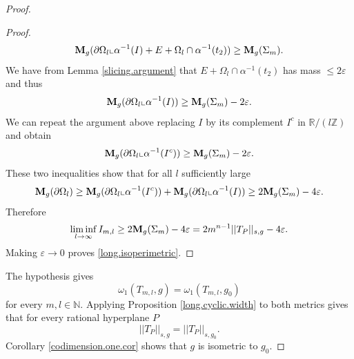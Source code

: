 \documentclass[11pt]{amsart}
\def\R{\mathbb R}
\def\N{\mathbb N}
\def\Z{\mathbb Z}
\theoremstyle{remark}
\theoremstyle{definition}
\begin{document}
\begin{proof}
\begin{proof}
			$${\bf  M}_g(\partial \Omega_l\llcorner \alpha^{-1}(I)+E+\Omega_l\cap\alpha^{-1}(t_2))\geq {\bf M}_g(\Sigma_m).$$
			We have from  Lemma \ref{slicing.argument} that $E+\Omega_l\cap\alpha^{-1}(t_2)$ has mass $\leq 2\varepsilon$ and thus
			$$
			{\bf M}_g(\partial \Omega_l\llcorner \alpha^{-1}(I)) \geq {\bf M}_g(\Sigma_m)-2\varepsilon.
			$$
			We can repeat the argument above replacing $I$ by its complement $I^c$ in $\R/(l\Z)$ and obtain
			$$
			{\bf M}_g(\partial \Omega_l\llcorner \alpha^{-1}(I^c)) \geq {\bf M}_g(\Sigma_m)-2\varepsilon.
			$$
			These two inequalities show that for all $l$ sufficiently large
			$${\bf M}_g(\partial \Omega_l)\geq{\bf M}_g(\partial \Omega_l\llcorner \alpha^{-1}(I^c))+{\bf M}_g(\partial \Omega_l\llcorner \alpha^{-1}(I)) \geq  2{\bf M}_g(\Sigma_m)-4\varepsilon.
			$$
			Therefore
			$$
			\liminf_{l\to\infty}I_{m,l}\geq 2{\bf M}_g(\Sigma_m)-4\varepsilon=2m^{n-1}||T_P||_{s,g}-4\varepsilon.
			$$
			Making $\varepsilon\to 0$ proves \eqref{long.isoperimetric}.
		\end{proof}
		
		The hypothesis gives
		$$
		\omega_1(T_{m,l},g)=\omega_1(T_{m,l},g_0)
		$$
		for every $m,l\in\N$. Applying Proposition \ref{long.cyclic.width} to both metrics gives that for every rational hyperplane $P$ 
		$$
		||T_P||_{s,g}=||T_P||_{s,g_0}.
		$$
		Corollary \ref{codimension.one.cor} shows that $g$ is isometric to $g_0$.
	\end{proof}
	
	\appendix
	
\end{document}

